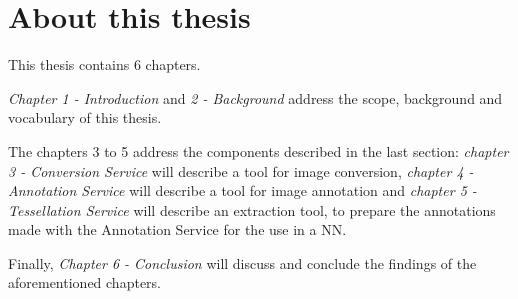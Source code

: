 \section{About this thesis}
This thesis contains 6 chapters.

\emph{Chapter 1 - Introduction} and \emph{2 - Background} address the scope, background and vocabulary of this thesis.

The chapters 3 to 5 address the components described in the last section: \emph{chapter 3 - Conversion Service} will describe a tool for image conversion, \emph{chapter 4 - Annotation Service} will describe a tool for image annotation and \emph{chapter 5 - Tessellation Service} will describe an extraction tool, to prepare the annotations made with the Annotation Service for the use in a NN.

Finally, \emph{Chapter 6 - Conclusion} will discuss and conclude the findings of the aforementioned chapters.